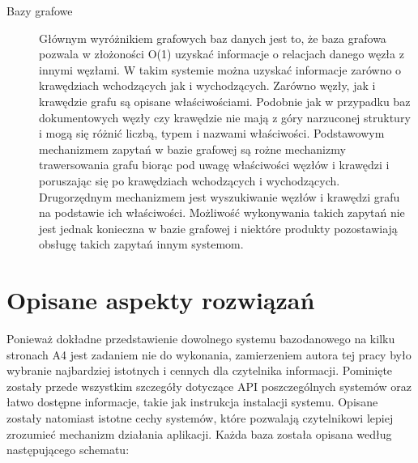 \begin{description}
 \item[Bazy grafowe]
 Głównym wyróżnikiem grafowych baz danych jest to, że baza grafowa pozwala w złożoności O(1) uzyskać informacje o relacjach danego węzła z innymi węzłami.
 W takim systemie można uzyskać informacje zarówno o krawędziach wchodzących jak i wychodzących.
 Zarówno węzły, jak i krawędzie grafu są opisane właściwościami.
 Podobnie jak w przypadku baz dokumentowych węzły czy krawędzie nie mają z góry narzuconej struktury i mogą się różnić liczbą, typem i nazwami właściwości.
 Podstawowym mechanizmem zapytań w bazie grafowej są rożne mechanizmy trawersowania grafu biorąc pod uwagę właściwości węzłów i krawędzi i poruszając się po krawędziach wchodzących i wychodzących.
 Drugorzędnym mechanizmem jest wyszukiwanie węzłów i krawędzi grafu na podstawie ich właściwości.
 Możliwość wykonywania takich zapytań nie jest jednak konieczna w bazie grafowej i niektóre produkty pozostawiają obsługę takich zapytań innym systemom. 
\end{description}

\section{Opisane aspekty rozwiązań}

Ponieważ dokładne przedstawienie dowolnego systemu bazodanowego na kilku stronach A4 jest zadaniem nie do wykonania, zamierzeniem autora tej pracy było wybranie najbardziej istotnych i cennych dla czytelnika informacji.
Pominięte zostały przede wszystkim szczegóły dotyczące API poszczególnych systemów oraz łatwo dostępne informacje, takie jak instrukcja instalacji systemu.
Opisane zostały natomiast istotne cechy systemów, które pozwalają czytelnikowi lepiej zrozumieć mechanizm działania aplikacji.
Każda baza została opisana według następującego schematu:

